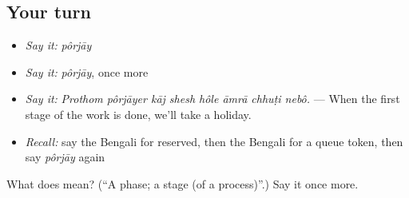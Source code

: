 \subsection*{Your turn}
\begin{itemize}
\raggedright
  \item \emph{Say it:} \emph{pôrjāy}
  \item \emph{Say it:} \emph{pôrjāy}, once more
  \item \emph{Say it:} \emph{Prothom pôrjāyer kāj shesh hôle āmrā chhuṭi nebô.} — When the first stage of the work is done, we'll take a holiday.
  \item \emph{Recall:} say the Bengali for reserved, then the Bengali for a queue token, then say \emph{pôrjāy} again
\end{itemize}

\begin{tcolorbox}[breakable,colback=teal!4,colframe=teal!35!black,title={Before you move on}]
What does  mean? (\textquotedblleft{}A phase; a stage (of a process)\textquotedblright{}.) Say it once more.
\end{tcolorbox}
